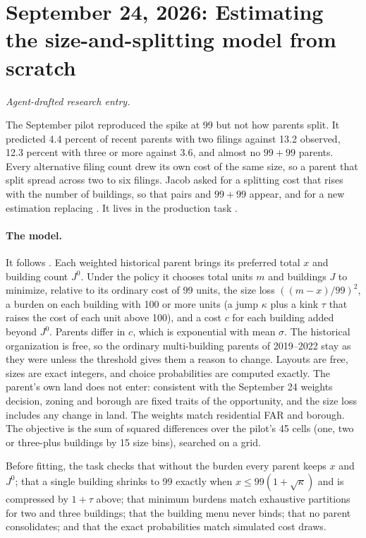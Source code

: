 \clearpage
\section*{September 24, 2026: Estimating the size-and-splitting model from scratch}
\textit{Agent-drafted research entry.}

The September pilot reproduced the spike at 99 but not how parents split. It
predicted 4.4 percent of recent parents with two filings against 13.2
observed, 12.3 percent with three or more against 3.6, and almost no $99+99$
parents. Every alternative filing count drew its own cost of the same size, so a
parent that split spread across two to six filings. Jacob asked for a
splitting cost that rises with the number of buildings, so that pairs and
$99+99$ appear, and for a new estimation replacing
. It lives in the production task
.

\paragraph{The model.} It follows . Each weighted
historical parent brings its preferred total $x$ and building count $J^0$.
Under the policy it chooses total units $m$ and buildings $J$ to minimize,
relative to its ordinary cost of 99 units, the size loss $((m-x)/99)^2$, a
burden on each building with 100 or more units (a jump $\kappa$ plus a kink
$\tau$ that raises the cost of each unit above 100), and a cost $c$ for each
building added beyond $J^0$. Parents differ in $c$, which is exponential with
mean $\sigma$. The historical organization is free, so the ordinary
multi-building parents of 2019--2022 stay as they were unless the threshold
gives them a reason to change. Layouts are free, sizes are exact integers, and
choice probabilities are computed exactly. The parent's own land does not
enter: consistent with the September 24 weights decision, zoning and borough
are fixed traits of the opportunity, and the size loss includes any change in
land. The weights match residential FAR and borough. The objective is the
sum of squared differences over the pilot's 45 cells (one, two or three-plus
buildings by 15 size bins), searched on a grid.

Before fitting, the task checks that without the burden every parent keeps
$x$ and $J^0$; that a single building shrinks to 99 exactly when
$x\le99(1+\sqrt\kappa)$ and is compressed by $1+\tau$ above; that minimum
burdens match exhaustive partitions for two and three buildings; that the
building menu never binds; that no parent consolidates; and that the exact
probabilities match simulated cost draws.

